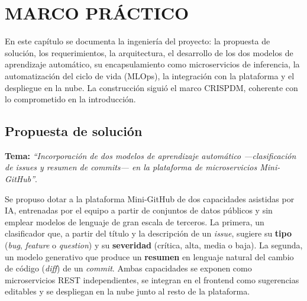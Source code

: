 %
%
\newpage

%
%

\section{MARCO PRÁCTICO}

En este capítulo se documenta la ingeniería del proyecto: la propuesta de solución, los requerimientos, la arquitectura, el desarrollo de los dos modelos de aprendizaje automático, su encapsulamiento como microservicios de inferencia, la automatización del ciclo de vida (\acrshort{MLOps}), la integración con la plataforma y el despliegue en la nube. La construcción siguió el marco \acrshort{CRISPDM}, coherente con lo comprometido en la introducción.

\subsection{Propuesta de solución}

\textbf{Tema:} \textit{``Incorporación de dos modelos de aprendizaje automático —clasificación de \textit{issues} y resumen de \textit{commits}— en la plataforma de microservicios Mini-GitHub''}.

\vspace{0.4em}

Se propuso dotar a la plataforma Mini-GitHub de dos capacidades asistidas por \acrfull{IA}, entrenadas por el equipo a partir de conjuntos de datos públicos y sin emplear modelos de lenguaje de gran escala de terceros. La primera, un clasificador que, a partir del título y la descripción de un \textit{issue}, sugiere su \textbf{tipo} (\textit{bug}, \textit{feature} o \textit{question}) y su \textbf{severidad} (crítica, alta, media o baja). La segunda, un modelo generativo que produce un \textbf{resumen} en lenguaje natural del cambio de código (\textit{diff}) de un \textit{commit}. Ambas capacidades se exponen como microservicios \acrshort{REST} independientes, se integran en el frontend como sugerencias editables y se despliegan en la nube junto al resto de la plataforma.

